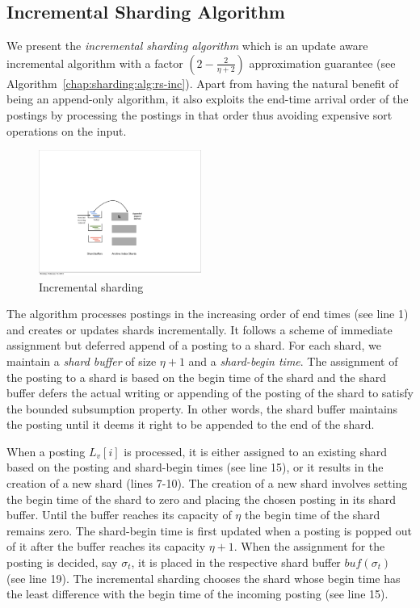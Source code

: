 \subsection{Incremental Sharding Algorithm}

We present the \emph{incremental sharding algorithm} which is an update aware incremental algorithm with a factor $(2  -  \frac{2}{\eta+2})$ approximation guarantee (see Algorithm~\ref{chap:sharding:alg:rs-inc}). Apart from having the natural benefit of being an append-only algorithm, it also exploits the end-time arrival order of the postings %
by processing the postings in that order thus avoiding expensive sort operations on the input. 

\begin{figure}[tb]
	\centering
		\includegraphics[width=0.475\textwidth]{resources/inc_sharding.pdf}
	\caption{Incremental sharding}
	 \label{fig:inc_sharding}
\end{figure}

The algorithm processes postings in the increasing order of end times (see line 1) and creates or updates shards incrementally. It follows a scheme of immediate assignment but deferred append of a posting to a shard. For each shard, we maintain a \emph{shard buffer} of size $\eta+1$ and a \emph{shard-begin time}. The assignment of the posting to a shard is based on the begin time of the shard and the shard buffer defers the actual writing or appending of the posting of the shard to satisfy the bounded subsumption property. In other words, the shard buffer maintains the posting until it deems it right to be appended to the end of the shard.

When a posting $L_v[i]$ is processed, it is either assigned to an existing shard based on the posting and shard-begin times (see line 15), or it results in the creation of a new shard (lines 7-10). The creation of a new shard involves setting the begin time of the shard to zero and placing the chosen posting in its shard buffer. Until the buffer reaches its capacity of $\eta$ the begin time of the shard remains zero. The shard-begin time is first updated when a posting is popped out of it after the buffer reaches its capacity $\eta+1$.  When the assignment for the posting is decided, say $\sigma_t$, it is placed in the respective shard buffer $buf(\sigma_t)$ (see line 19). The incremental sharding chooses the shard whose begin time has the least difference with the begin time of the incoming posting (see line 15). 

